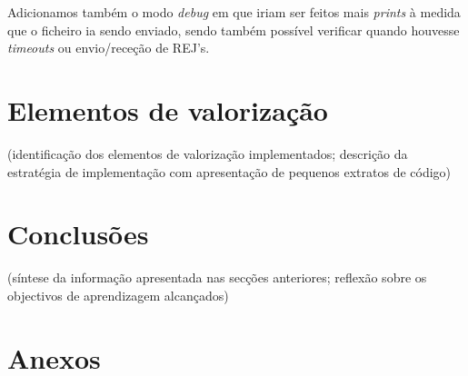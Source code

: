 \documentclass[11pt]{article}
\begin{document}
Adicionamos também o modo \textit{debug} em que iriam ser feitos mais \textit{prints} à medida que o ficheiro ia sendo enviado, sendo também possível verificar quando houvesse \textit{timeouts} ou envio/receção de REJ's. 






\newpage
\section{ Elementos de valorização}
  (identificação dos elementos de valorização implementados; descrição da estratégia de implementação com apresentação de pequenos extratos de código) 



\newpage
\section{Conclusões}
 (síntese da informação apresentada nas secções anteriores; reflexão sobre os objectivos de aprendizagem alcançados)



\newpage
\section{Anexos}



\end{document}
